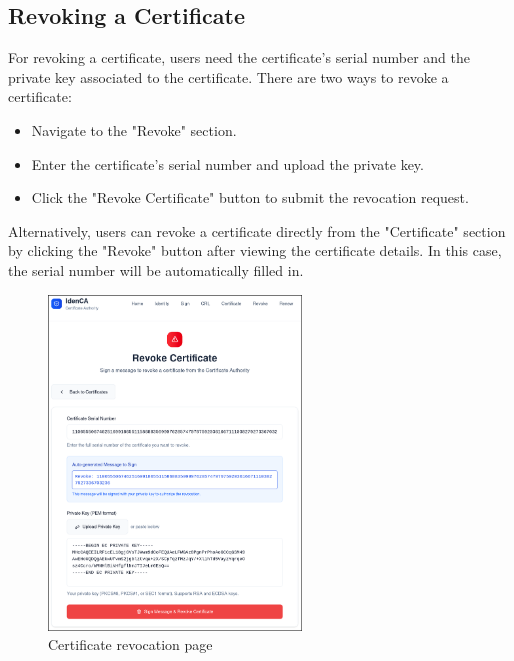 \subsection{Revoking a Certificate}
For revoking a certificate, users need the certificate's serial number and the private key 
associated to the certificate. There are two ways to revoke a certificate:
\begin{itemize}
    \item Navigate to the "Revoke" section.
    \item Enter the certificate's serial number and upload the private key.
    \item Click the "Revoke Certificate" button to submit the revocation request.
\end{itemize}
Alternatively, users can revoke a certificate directly from the "Certificate" section by 
clicking the "Revoke" button after viewing the certificate details.
In this case, the serial number will be automatically filled in.
\begin{figure}[h!]
    \centering
    \includegraphics[keepaspectratio, width=0.6\textwidth]{Pic/9_revoke_certificate.png}
    \caption{Certificate revocation page}
    \label{fig:revocation-flow}
\end{figure}

